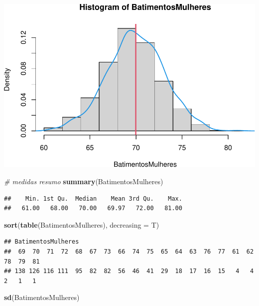 \documentclass[
]{book}
\newenvironment{Shaded}{\begin{snugshade}}{\end{snugshade}}
\newcommand{\AttributeTok}[1]{\textcolor[rgb]{0.13,0.29,0.53}{#1}}
\newcommand{\CommentTok}[1]{\textcolor[rgb]{0.56,0.35,0.01}{\textit{#1}}}
\newcommand{\FunctionTok}[1]{\textcolor[rgb]{0.13,0.29,0.53}{\textbf{#1}}}
\newcommand{\NormalTok}[1]{#1}
\begin{document}
\includegraphics{LivroEstatisticaR_files/figure-latex/unnamed-chunk-23-2.pdf}

\begin{Shaded}
\begin{Highlighting}[]
\CommentTok{\# medidas resumo}
\FunctionTok{summary}\NormalTok{(BatimentosMulheres)}
\end{Highlighting}
\end{Shaded}

\begin{verbatim}
##    Min. 1st Qu.  Median    Mean 3rd Qu.    Max. 
##   61.00   68.00   70.00   69.97   72.00   81.00
\end{verbatim}

\begin{Shaded}
\begin{Highlighting}[]
\FunctionTok{sort}\NormalTok{(}\FunctionTok{table}\NormalTok{(BatimentosMulheres), }\AttributeTok{decreasing =}\NormalTok{ T)}
\end{Highlighting}
\end{Shaded}

\begin{verbatim}
## BatimentosMulheres
##  69  70  71  72  68  67  73  66  74  75  65  64  63  76  77  61  62  78  79  81 
## 138 126 116 111  95  82  82  56  46  41  29  18  17  16  15   4   4   2   1   1
\end{verbatim}

\begin{Shaded}
\begin{Highlighting}[]
\FunctionTok{sd}\NormalTok{(BatimentosMulheres)}
\end{Highlighting}
\end{Shaded}
\end{document}
